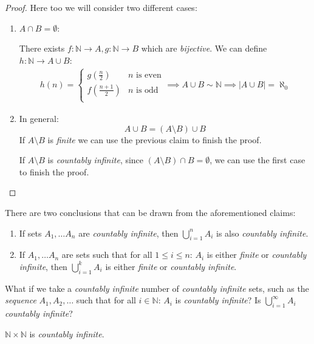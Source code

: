 \documentclass[00_complete]{subfiles}
\begin{document}
\begin{proof}
    Here too we will consider two different cases:
    \begin{enumerate}
        \item $A \cap B = \emptyset$:

        There exists $f:\mathbb{N}\to A,g:\mathbb{N}\to B$ which are
        \emph{bijective}. We can define $h: \mathbb{N} \to A \cup B$:
        \begin{gather*}
        h(n)=\begin{cases}
            g(\frac{n}{2}) & \text{$n$ is even} \\
            f(\frac{n+1}{2}) & \text{$n$ is odd} \\
        \end{cases} \implies A \cup B \sim \mathbb{N} \implies |A\cup B| =
        \aleph_0
        \end{gather*}
        \item In general:
        $$A \cup B = (A \setminus B) \cup B$$
        If $A \setminus B$ is \emph{finite} we can use the previous claim to
        finish the proof.

        If $A \setminus B$ is \emph{countably infinite}, since $(A \setminus B)
        \cap B = \emptyset$, we can use the first case to finish the proof.
    \end{enumerate}
\end{proof}
\begin{conclusion}
    There are two conclusions that can be drawn from the aforementioned claims:
    \begin{enumerate}
       \item If sets $A_1,\dots A_n$ are \emph{countably infinite}, then
           $\bigcup_{i=1}^nA_i$ is also \emph{countably infinite}.
       \item If $A_1,\dots A_n$ are sets such that for all $1 \leq i \leq n$:
           $A_i$ is either \emph{finite} or \emph{countably infinite}, then
           $\bigcup_{i=1}^kA_i$ is either \emph{finite} or \emph{countably
           infinite}.
    \end{enumerate}
\end{conclusion}
    What if we take a \emph{countably infinite} number of \emph{countably infinite} sets, such as the
    \emph{sequence} $A_1,A_2,\dots$ such that for all $i \in \mathbb{N}$: $A_i$
    is \emph{countably infinite}? Is $\bigcup_{i=1}^{\infty}A_i$
    \emph{countably infinite}?
\begin{claim}
    $\mathbb{N}\times\mathbb{N}$ is \emph{countably infinite}.
\end{claim}
\end{document}

